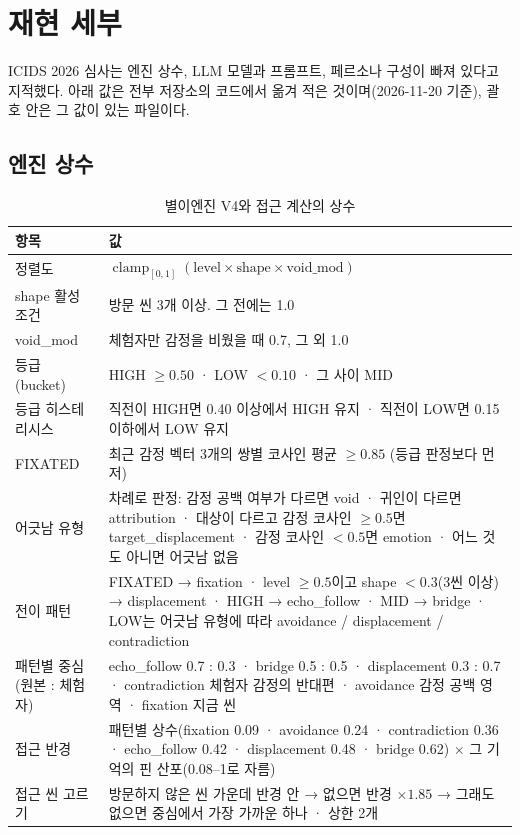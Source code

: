 \documentclass[11pt, a4paper]{article}
\begin{document}
\section{재현 세부}
\label{app:repro}

ICIDS 2026 심사는 엔진 상수, LLM 모델과 프롬프트, 페르소나 구성이 빠져 있다고 지적했다. 아래 값은 전부 저장소의 코드에서 옮겨 적은 것이며(2026-11-20 기준), 괄호 안은 그 값이 있는 파일이다.

\subsection{엔진 상수}
\label{app:engine}

\begin{table}[H]
\centering
\caption{별이엔진 V4와 접근 계산의 상수}
\small
\begin{tabular}{p{4.6cm} p{9.6cm}}
\toprule
\textbf{항목} & \textbf{값} \\
\midrule
정렬도 & $\operatorname{clamp}_{[0,1]}(\text{level}\times\text{shape}\times\text{void\_mod})$ \\
shape 활성 조건 & 방문 씬 3개 이상. 그 전에는 1.0 \\
void\_mod & 체험자만 감정을 비웠을 때 0.7, 그 외 1.0 \\
등급 (bucket) & HIGH $\geq 0.50$ · LOW $< 0.10$ · 그 사이 MID \\
등급 히스테리시스 & 직전이 HIGH면 0.40 이상에서 HIGH 유지 · 직전이 LOW면 0.15 이하에서 LOW 유지 \\
FIXATED & 최근 감정 벡터 3개의 쌍별 코사인 평균 $\geq 0.85$ (등급 판정보다 먼저) \\
어긋남 유형 & 차례로 판정: 감정 공백 여부가 다르면 void · 귀인이 다르면 attribution · 대상이 다르고 감정 코사인 $\geq 0.5$면 target\_displacement · 감정 코사인 $< 0.5$면 emotion · 어느 것도 아니면 어긋남 없음 \\
전이 패턴 & FIXATED → fixation · level $\geq 0.5$이고 shape $< 0.3$(3씬 이상) → displacement · HIGH → echo\_follow · MID → bridge · LOW는 어긋남 유형에 따라 avoidance / displacement / contradiction \\
패턴별 중심 (원본 : 체험자) & echo\_follow 0.7 : 0.3 · bridge 0.5 : 0.5 · displacement 0.3 : 0.7 · contradiction 체험자 감정의 반대편 · avoidance 감정 공백 영역 · fixation 지금 씬 \\
접근 반경 & 패턴별 상수(fixation 0.09 · avoidance 0.24 · contradiction 0.36 · echo\_follow 0.42 · displacement 0.48 · bridge 0.62) $\times$ 그 기억의 핀 산포(0.08--1로 자름) \\
접근 씬 고르기 & 방문하지 않은 씬 가운데 반경 안 → 없으면 반경 $\times 1.85$ → 그래도 없으면 중심에서 가장 가까운 하나 · 상한 2개 \\
\bottomrule
\end{tabular}
\end{table}
\end{document}
